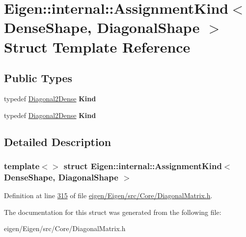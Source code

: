 \hypertarget{struct_eigen_1_1internal_1_1_assignment_kind_3_01_dense_shape_00_01_diagonal_shape_01_4}{}\section{Eigen\+:\+:internal\+:\+:Assignment\+Kind$<$ Dense\+Shape, Diagonal\+Shape $>$ Struct Template Reference}
\label{struct_eigen_1_1internal_1_1_assignment_kind_3_01_dense_shape_00_01_diagonal_shape_01_4}
\subsection*{Public Types}
\begin{DoxyCompactItemize}
\item 
\mbox{\label{struct_eigen_1_1internal_1_1_assignment_kind_3_01_dense_shape_00_01_diagonal_shape_01_4_a37ad5764b16d3d88e2f84737be93c88a}} 
typedef \hyperlink{struct_eigen_1_1internal_1_1_diagonal2_dense}{Diagonal2\+Dense} {\bfseries Kind}
\item 
\mbox{\label{struct_eigen_1_1internal_1_1_assignment_kind_3_01_dense_shape_00_01_diagonal_shape_01_4_a37ad5764b16d3d88e2f84737be93c88a}} 
typedef \hyperlink{struct_eigen_1_1internal_1_1_diagonal2_dense}{Diagonal2\+Dense} {\bfseries Kind}
\end{DoxyCompactItemize}


\subsection{Detailed Description}
\subsubsection*{template$<$$>$\newline
struct Eigen\+::internal\+::\+Assignment\+Kind$<$ Dense\+Shape, Diagonal\+Shape $>$}



Definition at line \hyperlink{eigen_2_eigen_2src_2_core_2_diagonal_matrix_8h_source_l00315}{315} of file \hyperlink{eigen_2_eigen_2src_2_core_2_diagonal_matrix_8h_source}{eigen/\+Eigen/src/\+Core/\+Diagonal\+Matrix.\+h}.



The documentation for this struct was generated from the following file\+:\begin{DoxyCompactItemize}
\item 
eigen/\+Eigen/src/\+Core/\+Diagonal\+Matrix.\+h\end{DoxyCompactItemize}
